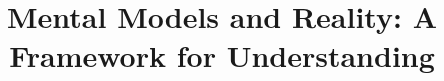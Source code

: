 ﻿\usepackage[utf8]{inputenc}
\usepackage[T1]{fontenc}
\usepackage{geometry}
\usepackage{amsmath}
\usepackage{amssymb}
\usepackage{graphicx}
\usepackage{titlesec}
\usepackage{enumitem}
\usepackage{hyperref}
\usepackage{pythontex}
\usepackage{tikz}
\usepackage{amsmath}

\geometry{a4paper, margin=1in}

\title{Mental Models and Reality: A Framework for Understanding}
\author{}
\date{}

\titleformat{\section}{\large\bfseries}{\thesection}{1em}{}
\titleformat{\subsection}{\bfseries}{\thesubsection}{1em}{}